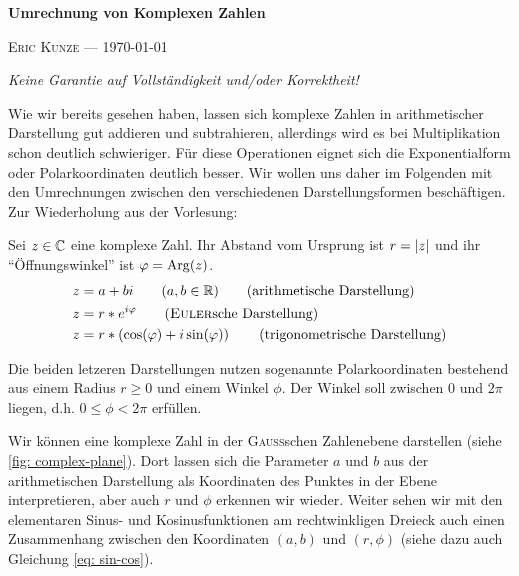\documentclass[ngerman, a4paper, 11pt]{article}
\theoremstyle{nonumberplain}
\newcommand*\ruleline[1]{\par\noindent\raisebox{.8ex}{\makebox[\linewidth]{\hrulefill\hspace{1ex}\raisebox{-.8ex}{#1}\hspace{1ex}\hrulefill}}}
\renewcommand{\i}{i}
\begin{document}
	\begin{center}
		{\bfseries \sffamily \huge Umrechnung von Komplexen Zahlen} 
		
		\ruleline{\sffamily \Large Übungsblatt 1}
		
		{\scshape Eric Kunze --- \today}
	\end{center}
	\medskip
	
	{ \footnotesize \doclicenseThis }
	
	\begin{center}
		\small \slshape Keine Garantie auf Vollständigkeit und/oder Korrektheit!
	\end{center}
	
	Wie wir bereits gesehen haben, lassen sich komplexe Zahlen in arithmetischer Darstellung gut addieren und subtrahieren, allerdings wird es bei Multiplikation schon deutlich schwieriger. Für diese Operationen eignet sich die Exponentialform oder Polarkoordinaten deutlich besser. Wir wollen uns daher im Folgenden mit den Umrechnungen zwischen den verschiedenen Darstellungsformen beschäftigen. Zur Wiederholung aus der Vorlesung:
	
	\begin{tcolorbox}[colback=cdblue!10,colframe=cdblue]
		Sei $z \in \mathbb{C}$ eine komplexe Zahl. Ihr Abstand vom Ursprung ist $r = \left| z \right|$ und ihr \enquote{Öffnungswinkel} ist $\varphi = \operatorname{Arg}(z)$.
		\begin{align*}
			z &= a + b \i \qquad (a,b \in \R) 
			\tag{arithmetische Darstellung} \\
			z &= r * e^{\i \phi}  
			\tag{\textsc{Euler}sche Darstellung} \\
			z &= r * \brackets{ \cos(\phi) + \i \sin(\phi)}
			\tag{trigonometrische Darstellung}
		\end{align*}
	\end{tcolorbox}
	
	Die beiden letzeren Darstellungen nutzen sogenannte Polarkoordinaten bestehend aus einem Radius $r \ge 0$ und einem Winkel $\phi$. Der Winkel soll zwischen $0$ und $2\pi$ liegen, d.h. $0 \le \phi < 2\pi$ erfüllen. 
	
	Wir können eine komplexe Zahl in der \textsc{Gauß}schen Zahlenebene darstellen (siehe \cref{fig: complex-plane}). Dort lassen sich die Parameter $a$ und $b$ aus der arithmetischen Darstellung als Koordinaten des Punktes in der Ebene interpretieren, aber auch $r$ und $\phi$ erkennen wir wieder. Weiter sehen wir mit den elementaren Sinus- und Kosinusfunktionen am rechtwinkligen Dreieck auch einen Zusammenhang zwischen den Koordinaten $(a,b)$ und $(r,\phi)$ (siehe dazu auch Gleichung \eqref{eq: sin-cos}).
	
\end{document}
